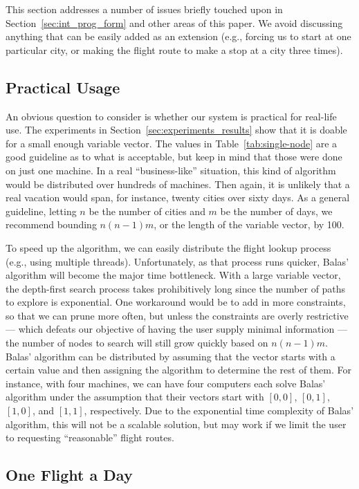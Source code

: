 \documentclass{article}
\begin{document}
This section addresses a number of issues briefly touched upon in Section~\ref{sec:int_prog_form} and other areas of this paper. We avoid discussing
anything that can be easily added as an extension (e.g., forcing us to start at one particular city, or making the flight route to make a stop at a
city three times).

\subsection{Practical Usage}

An obvious question to consider is whether our system is practical for real-life use. The experiments in Section~\ref{sec:experiments_results} show
that it is doable for a small enough variable vector. The values in Table~\ref{tab:single-node} are a good guideline as to what is acceptable, but
keep in mind that those were done on just one machine. In a real ``business-like'' situation, this kind of algorithm would be distributed over
hundreds of machines. Then again, it is unlikely that a real vacation would span, for instance, twenty cities over sixty days. As a general guideline,
letting $n$ be the number of cities and $m$ be the number of days, we recommend bounding $n(n-1)m$, or the length of the variable vector, by 100.

To speed up the algorithm, we can easily distribute the flight lookup process (e.g., using multiple threads). Unfortunately, as that process runs
quicker, Balas' algorithm will become the major time bottleneck. With a large variable vector, the depth-first search process takes prohibitively long
since the number of paths to explore is exponential. One workaround would be to add in more constraints, so that we can prune more often, but unless
the constraints are overly restrictive --- which defeats our objective of having the user supply minimal information --- the number of nodes to search
will still grow quickly based on $n(n-1)m$. Balas' algorithm can be distributed by assuming that the vector starts with a certain value and then
assigning the algorithm to determine the rest of them. For instance, with four machines, we can have four computers each solve Balas' algorithm under
the assumption that their vectors start with $[0,0]$, $[0,1]$, $[1,0]$, and $[1,1]$, respectively. Due to the exponential time complexity of Balas'
algorithm, this will not be a scalable solution, but may work if we limit the user to requesting ``reasonable'' flight routes.

\subsection{One Flight a Day}
\end{document}
